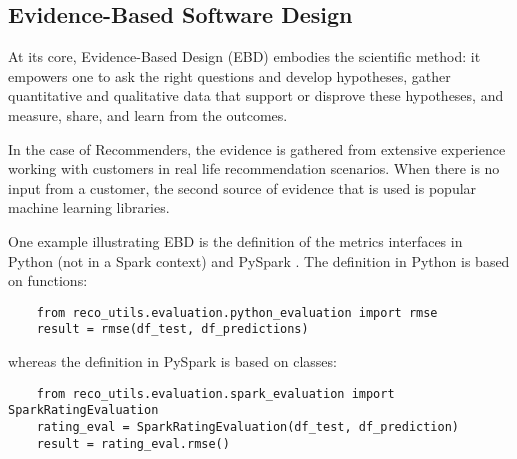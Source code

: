 %

\subsection{Evidence-Based Software Design}
At its core, Evidence-Based Design (EBD) \cite{kembel2012architectural,joeglekar2018evidence} embodies the 
scientific method: it empowers one to ask the right questions and develop hypotheses, 
gather quantitative and qualitative data that support or disprove these hypotheses, 
and measure, share, and learn from the outcomes.

In the case of Recommenders, the evidence is gathered from extensive experience working 
with customers in real life recommendation scenarios. When there is no input from a 
customer, the second source of evidence that is used is popular machine learning
libraries.

One example illustrating EBD is the definition of the metrics interfaces in Python (not in a Spark context) and 
PySpark \cite{meng2016mllib}. The definition in Python is based on functions:

\begin{verbatim}
    from reco_utils.evaluation.python_evaluation import rmse
    result = rmse(df_test, df_predictions)
\end{verbatim}

whereas the definition in PySpark is based on classes:
\begin{verbatim}
    from reco_utils.evaluation.spark_evaluation import SparkRatingEvaluation
    rating_eval = SparkRatingEvaluation(df_test, df_prediction)
    result = rating_eval.rmse()
\end{verbatim}

